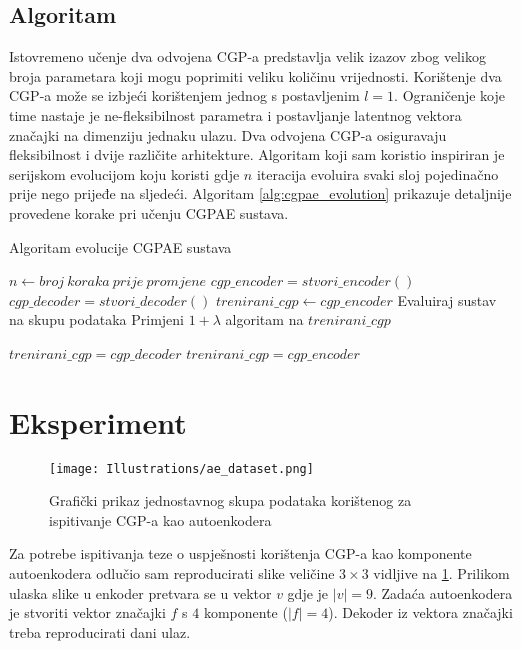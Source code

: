 \subsection{Algoritam}
Istovremeno učenje dva odvojena CGP-a predstavlja velik izazov zbog velikog broja parametara koji mogu poprimiti veliku količinu vrijednosti.
Korištenje dva CGP-a može se izbjeći korištenjem jednog s postavljenim $l = 1$.
Ograničenje koje time nastaje je ne-fleksibilnost parametra i postavljanje latentnog vektora značajki na dimenziju jednaku ulazu.
Dva odvojena CGP-a osiguravaju fleksibilnost i dvije različite arhitekture.
Algoritam koji sam koristio inspiriran je serijskom evolucijom koju koristi \cite{conv_gen_programming} gdje $n$ iteracija evoluira svaki sloj pojedinačno prije nego prijeđe na sljedeći.
Algoritam \ref{alg:cgpae_evolution} prikazuje detaljnije provedene korake pri učenju CGPAE sustava.

\begin{algorithm}
	\caption{Algoritam evolucije CGPAE sustava}
	\label{alg:cgpae_evolution}
	\begin{algorithmic}
		\STATE $n \leftarrow broj\ koraka\ prije\ promjene$
		\STATE $cgp\_encoder = stvori\_encoder()$
		\STATE $cgp\_decoder = stvori\_decoder()$
		\STATE $trenirani\_cgp \leftarrow cgp\_encoder$
			\STATE Evaluiraj sustav na skupu podataka
			\STATE Primjeni $1+\lambda$ algoritam na $trenirani\_cgp$

					\STATE $trenirani\_cgp = cgp\_decoder$
				\ELSE
					\STATE $trenirani\_cgp = cgp\_encoder$
				\ENDIF
			\ENDIF
		\ENDWHILE
	\end{algorithmic}
\end{algorithm}

\section{Eksperiment}

\begin{figure}[H]
	\centering
	\texttt{[image: Illustrations/ae\_dataset.png]}
	\caption{Grafički prikaz jednostavnog skupa podataka korištenog za ispitivanje CGP-a kao autoenkodera}
	\label{fig:ae_example}
\end{figure}

Za potrebe ispitivanja teze o uspješnosti korištenja CGP-a kao komponente autoenkodera odlučio sam reproducirati slike veličine $3 \times 3$ vidljive na \ref{fig:ae_example}.
Prilikom ulaska slike u enkoder pretvara se u vektor $v$ gdje je $|v| = 9$.
Zadaća autoenkodera je stvoriti vektor značajki $f$ s $4$ komponente ($|f| = 4$).
Dekoder iz vektora značajki treba reproducirati dani ulaz.


